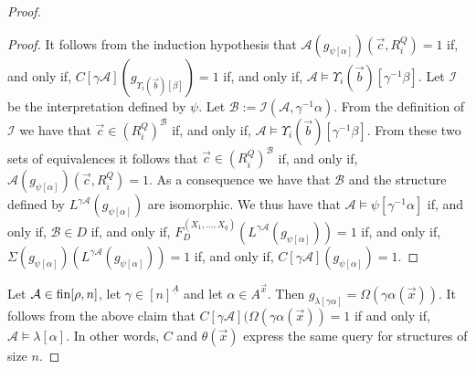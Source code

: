 \documentclass[../main/thesis.tex]{subfiles}
\begin{document}
\begin{proof}
\begin{proof}
  It follows from the induction hypothesis that
  $\mathcal{A}(g_{\psi[\alpha]})(\vec{c}, R^Q_i) = 1$ if, and only if, $C[\gamma
  \mathcal{A}](g_{\Upsilon_i(\vec{b})[\beta]}) = 1$ if, and only if,
  $\mathcal{A} \models \Upsilon_i (\vec{b})[\gamma^{-1} \beta]$. Let
  $\mathcal{I}$ be the interpretation defined by $\psi$. Let $\mathcal{B} :=
  \mathcal{I}(\mathcal{A}, \gamma^{-1} \alpha)$. From the definition of
  $\mathcal{I}$ we have that $\vec{c} \in (R^Q_i)^{\mathcal{B}}$ if, and only
  if, $\mathcal{A} \models \Upsilon_i (\vec{b})[\gamma^{-1} \beta]$. From these
  two sets of equivalences it follows that $\vec{c} \in (R^Q_i)^{\mathcal{B}}$
  if, and only if, $\mathcal{A}(g_{\psi[\alpha]})(\vec{c}, R^Q_i) = 1$. As a
  consequence we have that $\mathcal{B}$ and the structure defined by $L^{\gamma
    \mathcal{A}}(g_{\psi [\alpha]})$ are isomorphic. We thus have that
  $\mathcal{A} \models \psi[\gamma^{-1} \alpha]$ if, and only if, $\mathcal{B}
  \in D$ if, and only if, $F^{(X_1, \ldots, X_q)}_D(L^{\gamma
    \mathcal{A}}(g_{\psi [\alpha]})) = 1$ if, and only if,
  $\Sigma(g_{\psi[\alpha]})(L^{\gamma \mathcal{A}}(g_{\psi [\alpha]})) = 1$ if,
  and only if, $C[\gamma \mathcal{A}] (g_{\psi[\alpha]}) = 1$.
  


  


\end{proof}
Let $\mathcal{A} \in \text{\upshape fin}{[\rho, n]}$, let $\gamma \in [n]^{\underline{A}}$ and
let $\alpha \in A^{\vec{x}}$. Then $g_{\lambda [\gamma \alpha]} = \Omega (\gamma
\alpha (\vec{x}))$. It follows from the above claim that $C [\gamma \mathcal{A}]
(\Omega( \gamma \alpha (\vec{x})) = 1$ if and only if, $\mathcal{A} \models
\lambda [\alpha]$. In other words, $C$ and $\theta(\vec{x})$ express the same
query for structures of size $n$.



\end{proof}
\end{document}
